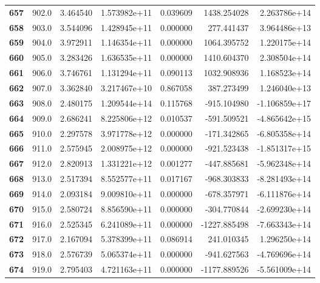 \documentclass{report}[12pt]
\begin{document}
\begin{center}
\begin{tabular}{lrrrrrr}
\textbf{657 } &          902.0 &   3.464540 &  1.573982e+11 &    0.039609 &  1438.254028 &  2.263786e+14 \\
\textbf{658 } &          903.0 &   3.544096 &  1.428945e+11 &    0.000000 &   277.441437 &  3.964486e+13 \\
\textbf{659 } &          904.0 &   3.972911 &  1.146354e+11 &    0.000000 &  1064.395752 &  1.220175e+14 \\
\textbf{660 } &          905.0 &   3.283426 &  1.636535e+11 &    0.000000 &  1410.604370 &  2.308504e+14 \\
\textbf{661 } &          906.0 &   3.746761 &  1.131294e+11 &    0.090113 &  1032.908936 &  1.168523e+14 \\
\textbf{662 } &          907.0 &   3.362840 &  3.217467e+10 &    0.867058 &   387.273499 &  1.246040e+13 \\
\textbf{663 } &          908.0 &   2.480175 &  1.209544e+14 &    0.115768 &  -915.104980 & -1.106859e+17 \\
\textbf{664 } &          909.0 &   2.686241 &  8.225806e+12 &    0.010537 &  -591.509521 & -4.865642e+15 \\
\textbf{665 } &          910.0 &   2.297578 &  3.971778e+12 &    0.000000 &  -171.342865 & -6.805358e+14 \\
\textbf{666 } &          911.0 &   2.575945 &  2.008975e+12 &    0.000000 &  -921.523438 & -1.851317e+15 \\
\textbf{667 } &          912.0 &   2.820913 &  1.331221e+12 &    0.001277 &  -447.885681 & -5.962348e+14 \\
\textbf{668 } &          913.0 &   2.517394 &  8.552577e+11 &    0.017167 &  -968.303833 & -8.281493e+14 \\
\textbf{669 } &          914.0 &   2.093184 &  9.009810e+11 &    0.000000 &  -678.357971 & -6.111876e+14 \\
\textbf{670 } &          915.0 &   2.580724 &  8.856590e+11 &    0.000000 &  -304.770844 & -2.699230e+14 \\
\textbf{671 } &          916.0 &   2.525345 &  6.241089e+11 &    0.000000 & -1227.885498 & -7.663343e+14 \\
\textbf{672 } &          917.0 &   2.167094 &  5.378399e+11 &    0.086914 &   241.010345 &  1.296250e+14 \\
\textbf{673 } &          918.0 &   2.576739 &  5.065374e+11 &    0.000000 &  -941.627563 & -4.769696e+14 \\
\textbf{674 } &          919.0 &   2.795403 &  4.721163e+11 &    0.000000 & -1177.889526 & -5.561009e+14 \\

\end{tabular}
\end{center}
\end{document}
